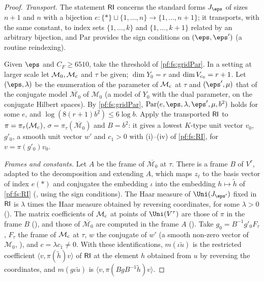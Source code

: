 \begin{proof}
\emph{Transport.} The statement $\mathsf{RI}$ concerns the standard forms $J_\eps$ of sizes $n+1$ and $n$ with a bijection
$e\colon\{\ast\}\sqcup\{1,\dots,n\}\to\{1,\dots,n+1\}$; it transports, with the same constant, to index sets $\{1,\dots,k\}$ and $\{1,\dots,k+1\}$
related by an arbitrary bijection, and $\mathrm{Par}$ provides the sign conditions on $(\eps,\eps')$ (a routine reindexing).

Given $\eps$ and $C_F\ge6510$, take the threshold of \cref{pf:fs:gridPar}. In a setting at larger scale let $\mathcal M_0,\mathcal M_{\mathrm{c}}$ and $\tau$
be given; $\dim Y_0=r$ and $\dim V_{\mathrm{c}_0}=r+1$. Let $(\eps,\lambda)$ be the enumeration of the parameter of $\mathcal M_{\mathrm{c}}$ at $\tau$ and $(\eps',\mu)$
that of the conjugate model $\overline{\mathcal M_0}$ of $\mathcal M_0$ (a model of $Y_0$ with the dual parameter, on the conjugate Hilbert spaces). By
\cref{pf:fs:gridPar}, $\mathrm{Par}(e,\eps,\lambda,\eps',\mu,b^2)$ holds for some $e$, and $\log(8(r+1)b^2)\le6\log b$. Apply the transported $\mathsf{RI}$ to
$\pi=\pi_\tau(\mathcal M_{\mathrm{c}})$, $\sigma=\pi_\tau(\overline{\mathcal M_0})$ and $B=b^2$: it gives a lowest $K$-type unit vector $v_0$, $g'_0$, a smooth unit
vector $w'$ and $c_1>0$ with (i)--(iv) of \cref{pf:fs:RI}, for $v=\pi(g'_0)v_0$.

\emph{Frames and constants.} Let $A$ be the frame of $\overline{\mathcal M_0}$ at $\tau$. There is a frame $B$ of $V^\tau$, adapted to the decomposition
and extending $A$, which maps $z_\ell$ to the basis vector of index $e(\ast)$ and conjugates the embedding $\iota$ into the embedding
$h\mapsto\tilde h$ of \cref{pf:fs:RI} (, using the sign conditions). The Haar measure of
$\Uni(J_{\eps'})$ fixed in $\mathsf{RI}$ is $\lambda$ times the Haar measure obtained by reversing coordinates, for some $\lambda>0$
(). The matrix coefficients of $\mathcal M_{\mathrm{c}}$ at points of $\Uni(V^\tau)$
are those of $\pi$ in the frame $B$ (), and those of $\overline{\mathcal M_0}$ are
computed in the frame $A$ (). Take $g_0=B^{-1}g'_0F_\tau$, $F_\tau$ the frame of
$\mathcal M_{\mathrm{c}}$ at $\tau$, $w$ the conjugate of $w'$ (a smooth non-zero vector of $\mathcal M_0$,
), and $c=\lambda c_1\ne0$. With these identifications, $m(\iota\tilde u)$
is the restricted coefficient $\langle v,\pi(\tilde h)v\rangle$ of $\mathsf{RI}$ at the element $h$ obtained from $u$ by reversing the coordinates, and
$m(g\iota\tilde u)$ is $\langle v,\pi(BgB^{-1}\tilde h)v\rangle$.


\end{proof}
